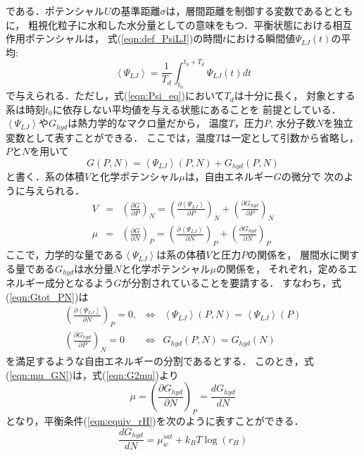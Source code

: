 である．ポテンシャル$U$の基準距離$\sigma$は，層間距離を制御する変数であるとともに，
粗視化粒子に水和した水分量としての意味をもつ．平衡状態における相互作用ポテンシャルは，
式(\ref{eqn:def_PsiLJ})の時間$t$における瞬間値$\Psi_{LJ}(t)$の平均:
\begin{equation}
	\left< \Psi_{LJ}\right>
	=
	\frac{1}{T_d}\int_{t_0}^{t_0+T_d} \Psi_{LJ}(t)dt
	\label{eqn:Psi_eq}
\end{equation}
で与えられる．ただし，式(\ref{eqn:Psi_eq})において$T_d$は十分に長く，
対象とする系は時刻$t_0$に依存しない平均値を与える状態にあることを
前提としている．\\
\hspace{\parindent}
$\left< \Psi_{LJ} \right>$や$G_{hyd}$は熱力学的なマクロ量だから，
温度$T$，圧力$P$, 水分子数$N$を独立変数として表すことができる．
ここでは，温度$T$は一定として引数から省略し，$P$と$N$を用いて
\begin{equation}
	G(P,N)=\left< \Psi_{LJ} \right>(P,N) +G_{hyd}(P,N)
	\label{eqn:Gtot_PN}
\end{equation}
と書く．系の体積$V$と化学ポテンシャル$\mu$は，自由エネルギー$G$の微分で
次のように与えられる．
\begin{eqnarray}
	V &= & 
	\left( \frac{\partial G}{\partial P} \right)_N 
	=
	\left( \frac{\partial \left< \Psi_{LJ}\right>}{\partial P} \right)_N 
	+
	\left( \frac{\partial G_{hyd}}{\partial P} \right)_N 
	\label{eqn:G2V}
	\\
	\mu &= & \left( \frac{\partial G}{\partial N} \right)_P 
	=
	\left( \frac{\partial \left< \Psi_{LJ}\right>}{\partial N} \right)_P 
	+
	\left( \frac{\partial G_{hyd}}{\partial N} \right)_P 
	\label{eqn:G2mu}
\end{eqnarray}
ここで，力学的な量である$\left<\Psi_{LJ}\right>$は系の体積$V$と圧力$P$の関係を，
層間水に関する量である$G_{hyd}$は水分量$N$と化学ポテンシャル$\mu$の関係を，
それぞれ，定めるエネルギー成分となるよう$G$が分割されていることを要請する．
すなわち，式(\ref{eqn:Gtot_PN})は
\begin{eqnarray}
	\left( \frac{\partial \left< \Psi_{LJ}\right>}{\partial N} \right)_P=0, 
	& \Leftrightarrow & 
	\left< \Psi_{LJ}\right>(P,N) = \left< \Psi_{LJ}\right>(P) 
	\label{eqn:assuption1}
	\\ 
	\left( \frac{\partial G_{hyd}}{\partial P} \right)_N =0
	& \Leftrightarrow & 
	 G_{hyd}(P,N) = G_{hyd}(N) 
	\label{eqn:G2mu}
	\label{eqn:asumption2}
\end{eqnarray}
を満足するような自由エネルギーの分割であるとする．
このとき，式(\ref{eqn:mu_GN})は，式(\ref{eqn:G2mu})より
\begin{equation}
	\mu= \left( \frac{\partial G_{hyd}}{\partial N} \right)_P 
	=
	\frac{dG_{hyd}}{dN}
	\label{eqn:G2mu_2}
\end{equation}
となり，平衡条件(\ref{eqn:equiv_rH})を次のように表すことができる．
\begin{equation}
	\frac{d G_{hyd}}{d N}
	=
	\mu_w^{sat} +k_BT \log \left( r_H \right)
	\label{eqn:mu_hyd}
\end{equation}

